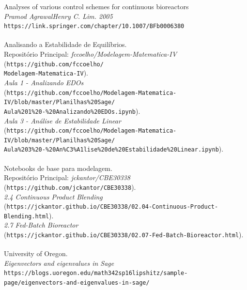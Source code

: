 \documentclass{article}
\begin{document}
\begin{thebibliography}{9}
Analyses of various control schemes for continuous bioreactors
\\
\textit{Pramod AgrawalHenry C. Lim. 2005}
\\\texttt{https://link.springer.com/chapter/10.1007/BFb0006380}
\\\\
Analisando a Estabilidade de Equilíbrios.
\\Repositório Principal: \textit{fccoelho/Modelagem-Matematica-IV} (\texttt{https://github.com/fccoelho/
\\Modelagem-Matematica-IV}). 
\\\textit{Aula 1 - Analizando EDOs}
\\(\texttt{https://github.com/fccoelho/Modelagem-Matematica-IV/blob/master/Planilhas\%20Sage/
\\Aula\%201\%20-\%20Analizando\%20EDOs.ipynb}).
\\\textit{Aula 3 - Análise de Estabilidade Linear} 
\\(\texttt{https://github.com/fccoelho/Modelagem-Matematica-IV/blob/master/Planilhas\%20Sage/
\\Aula\%203\%20-\%20An\%C3\%A1lise\%20de\%20Estabilidade\%20Linear.ipynb}).
\\\\
Notebooks de base para modelagem.
\\Repositório Principal: \textit{jckantor/CBE30338} (\texttt{https://github.com/jckantor/CBE30338}). 
\\\textit{2.4 Continuous Product Blending} 
\\(\texttt{https://jckantor.github.io/CBE30338/02.04-Continuous-Product-Blending.html}).
\\\textit{2.7 Fed-Batch Bioreactor} 
\\(\texttt{https://jckantor.github.io/CBE30338/02.07-Fed-Batch-Bioreactor.html}).
\\\\
University of Oregon.
\\
\textit{Eigenvectors and eigenvalues in Sage}
\\\texttt{https://blogs.uoregon.edu/math342sp16lipshitz/sample-page/eigenvectors-and-eigenvalues-in-sage/}
\\\\



\end{thebibliography} 
\end{document}
